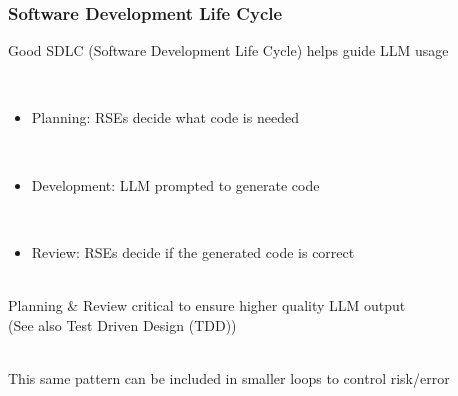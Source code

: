 \documentclass{beamer}
\begin{document}
\begin{frame}
\begin{center}
\frametitle{Software Development Life Cycle}

Good SDLC (Software Development Life Cycle) helps guide LLM usage

~\\

\begin{itemize}

\item Planning: RSEs decide what code is needed

~\\

\item Development: LLM prompted to generate code

~\\

\item Review: RSEs decide if the generated code is correct

\end{itemize}

~\\

Planning \& Review critical to ensure higher quality LLM output\\
(See also Test Driven Design (TDD))

~\\

This same pattern can be included in smaller loops to control risk/error

\end{center}
\end{frame}

\end{document}

